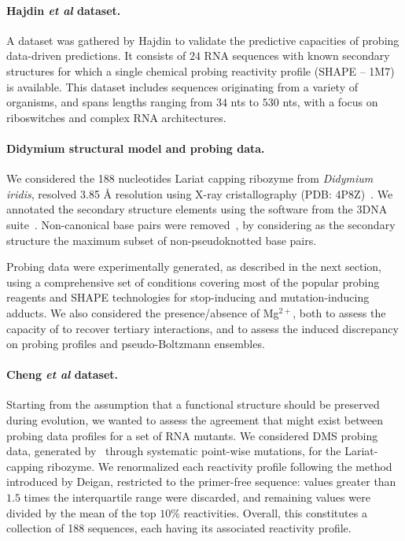 \documentclass[a4,center,fleqn]{NAR}
\begin{document}
\paragraph{Hajdin \emph{et al} dataset.} 
A dataset was gathered by Hajdin\etal\cite{Hajdin2013} to validate the predictive capacities of probing data-driven predictions. It consists of $24$ RNA sequences with known secondary structures for which a single chemical probing reactivity profile (SHAPE -- 1M7) is available.
This dataset includes sequences originating from a variety of organisms, and spans lengths ranging from $34$ nts to $530$ nts, with a focus on riboswitches and complex RNA architectures. 

\paragraph{Didymium structural model and probing data.} 
We considered the 188 nucleotides Lariat capping ribozyme from {\itshape Didymium iridis}, resolved 3.85 \AA{} resolution using X-ray cristallography (PDB: 4P8Z)~\citep{Meyer2014}.  We annotated the secondary structure elements using the  software from the 3DNA suite~\cite{Lu2015}. Non-canonical base pairs were removed~\citep{Smit2008}, by considering as the secondary structure the maximum subset of non-pseudoknotted base pairs.

Probing data were experimentally generated, as described in the next section, using a comprehensive set of conditions covering most of the popular probing reagents and SHAPE technologies for stop-inducing and mutation-inducing adducts. We also considered the presence/absence of Mg$^{2+}$, both to assess the capacity of \OurTool{} to recover tertiary interactions, and to assess the induced discrepancy on probing profiles and pseudo-Boltzmann ensembles.


\paragraph{Cheng  \emph{et al} dataset.} 
Starting from the assumption that a functional structure should be preserved during evolution, we wanted to assess the agreement that might exist between probing data profiles for a set of RNA mutants. 
We considered DMS probing data, generated by~\cite{Cheng2017} through systematic point-wise mutations, for the Lariat-capping ribozyme. We renormalized each reactivity profile following the method introduced by Deigan\etal\cite{Deigan2009}, restricted to the primer-free sequence: values greater than $1.5 $ times the interquartile range were discarded, and remaining values were divided by the mean of the top $10\%$ reactivities.  Overall, this constitutes a collection of 188 sequences, each having its associated reactivity profile.
\end{document}
